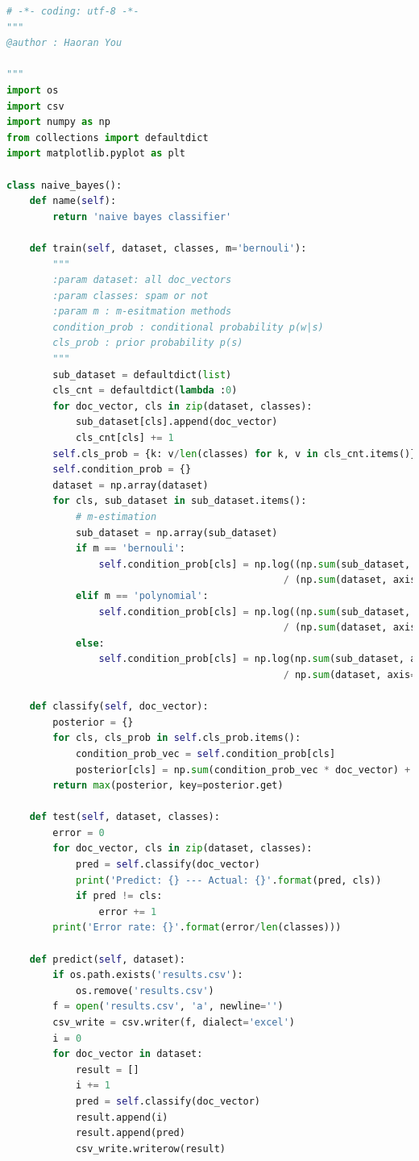 \documentclass[UTF-8, a4paper, 11pt]{article}
\numberwithin{equation}{section}
\begin{document}
\begin{lstlisting}[language=python]
# -*- coding: utf-8 -*-
"""
@author : Haoran You

"""
import os
import csv
import numpy as np
from collections import defaultdict
import matplotlib.pyplot as plt

class naive_bayes():
    def name(self):
        return 'naive bayes classifier'

    def train(self, dataset, classes, m='bernouli'):
        """
        :param dataset: all doc_vectors
        :param classes: spam or not
        :param m : m-esitmation methods
        condition_prob : conditional probability p(w|s)
        cls_prob : prior probability p(s)
        """
        sub_dataset = defaultdict(list)
        cls_cnt = defaultdict(lambda :0)
        for doc_vector, cls in zip(dataset, classes):
            sub_dataset[cls].append(doc_vector)
            cls_cnt[cls] += 1
        self.cls_prob = {k: v/len(classes) for k, v in cls_cnt.items()}
        self.condition_prob = {}
        dataset = np.array(dataset)
        for cls, sub_dataset in sub_dataset.items():
            # m-estimation
            sub_dataset = np.array(sub_dataset)
            if m == 'bernouli':
                self.condition_prob[cls] = np.log((np.sum(sub_dataset, axis=0) + 1)
                                                / (np.sum(dataset, axis=0) + 2))
            elif m == 'polynomial':
                self.condition_prob[cls] = np.log((np.sum(sub_dataset, axis=0) + 1)
                                                / (np.sum(dataset, axis=0) + len(sub_dataset[0])))
            else:
                self.condition_prob[cls] = np.log(np.sum(sub_dataset, axis=0)
                                                / np.sum(dataset, axis=0))

    def classify(self, doc_vector):
        posterior = {}
        for cls, cls_prob in self.cls_prob.items():
            condition_prob_vec = self.condition_prob[cls]
            posterior[cls] = np.sum(condition_prob_vec * doc_vector) + np.log(cls_prob)
        return max(posterior, key=posterior.get)

    def test(self, dataset, classes):
        error = 0
        for doc_vector, cls in zip(dataset, classes):
            pred = self.classify(doc_vector)
            print('Predict: {} --- Actual: {}'.format(pred, cls))
            if pred != cls:
                error += 1
        print('Error rate: {}'.format(error/len(classes)))

    def predict(self, dataset):
        if os.path.exists('results.csv'):
            os.remove('results.csv')
        f = open('results.csv', 'a', newline='')
        csv_write = csv.writer(f, dialect='excel')
        i = 0
        for doc_vector in dataset:
            result = []
            i += 1
            pred = self.classify(doc_vector)
            result.append(i)
            result.append(pred)
            csv_write.writerow(result)


\end{lstlisting}
\end{document}
